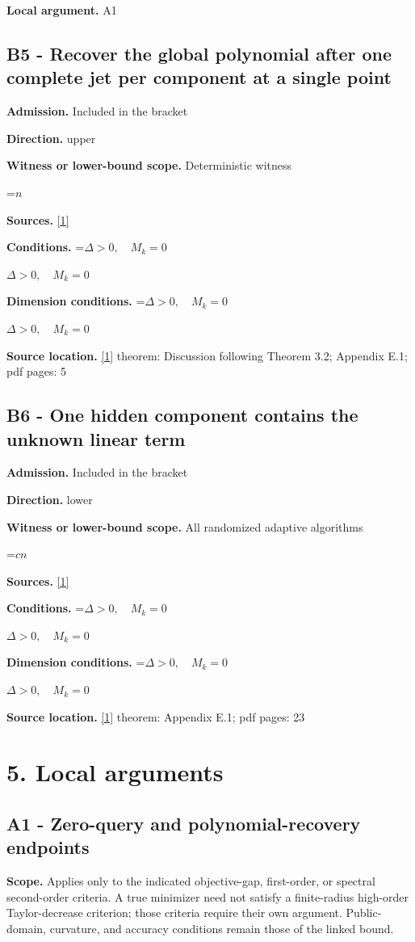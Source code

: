 \documentclass[10pt,a4paper]{article}
\newcommand{\AtlasMath}[1]{\par\begingroup\centering\setbox0=\hbox{$\displaystyle #1$}\ifdim\wd0>1.4\linewidth\typeout{ATLAS WIDE FORMULA: \the\wd0}\fi\ifdim\wd0>\linewidth\resizebox{\linewidth}{!}{\box0}\else\box0\fi\par\endgroup}
\newcommand{\AtlasInlineMath}[1]{\begingroup\setbox0=\hbox{$#1$}\ifdim\wd0>.4\linewidth\endgroup\AtlasMath{#1}\else\endgroup$#1$\fi}
\begin{document}
\textbf{Local argument.} A1

\subsection{B5 - Recover the global polynomial after one complete jet per component at a single point}
\textbf{Admission.} Included in the bracket

\textbf{Direction.} upper

\textbf{Witness or lower-bound scope.} Deterministic witness

\AtlasMath{n}
\textbf{Sources.} \href{https://arxiv.org/pdf/2609.28202v2}{[1]}

\textbf{Conditions.} \AtlasInlineMath{\Delta>0,\quad M_k=0}

\textbf{Dimension conditions.} \AtlasInlineMath{\Delta>0,\quad M_k=0}

\textbf{Source location.} \href{https://arxiv.org/pdf/2609.28202v2}{[1]} theorem: Discussion following Theorem 3.2; Appendix E.1; pdf pages: 5

\subsection{B6 - One hidden component contains the unknown linear term}
\textbf{Admission.} Included in the bracket

\textbf{Direction.} lower

\textbf{Witness or lower-bound scope.} All randomized adaptive algorithms

\AtlasMath{cn}
\textbf{Sources.} \href{https://arxiv.org/pdf/2609.28202v2}{[1]}

\textbf{Conditions.} \AtlasInlineMath{\Delta>0,\quad M_k=0}

\textbf{Dimension conditions.} \AtlasInlineMath{\Delta>0,\quad M_k=0}

\textbf{Source location.} \href{https://arxiv.org/pdf/2609.28202v2}{[1]} theorem: Appendix E.1; pdf pages: 23

\section{5. Local arguments}
\subsection{A1 - Zero-query and polynomial-recovery endpoints}
\textbf{Scope.} Applies only to the indicated objective-gap, first-order, or spectral second-order criteria. A true minimizer need not satisfy a finite-radius high-order Taylor-decrease criterion; those criteria require their own argument. Public-domain, curvature, and accuracy conditions remain those of the linked bound.
\end{document}
